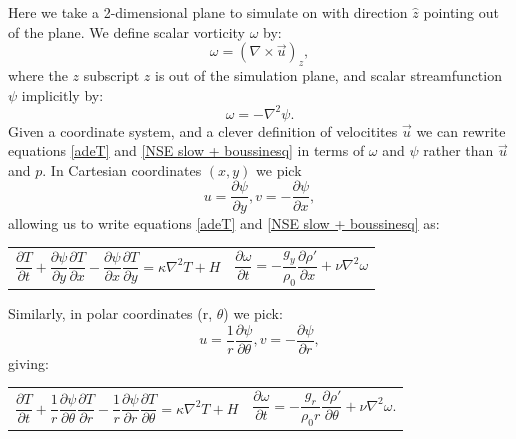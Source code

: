\documentclass{article}
\begin{document}
Here we take a 2-dimensional plane to simulate on with direction $\hat{z}$ pointing out of the plane. We define scalar vorticity $\omega$ by:
\begin{equation}
	\omega = (\nabla \times \vec{u})_z,
	\label{omega}
\end{equation}
where the $z$ subscript $z$ is out of the simulation plane, and scalar streamfunction $\psi$ implicitly by:
\begin{equation}
	\omega = - \nabla^2 \psi.
	\label{psi}
\end{equation}
Given a coordinate system, and a clever definition of velocitites $\vec{u}$ we can rewrite equations \ref{adeT} and \ref{NSE slow + boussinesq} in terms of $\omega$ and $\psi$ rather than $\vec{u}$ and $p$. In Cartesian coordinates $(x,y)$ we pick 
\begin{equation}
	u = \frac{\partial \psi}{\partial y}, v = -\frac{\partial \psi}{\partial x},
	\label{cartesian velocities}
\end{equation}
allowing us to write equations \ref{adeT} and \ref{NSE slow + boussinesq} as:
\begin{tabularx}{\textwidth}{XX}
\begin{equation}
	\frac{\partial T}{\partial t} + \frac{\partial \psi}{\partial y} \frac{\partial T}{\partial x} - \frac{\partial \psi}{\partial x} \frac{\partial T}{\partial y} = \kappa \nabla^2 T + H
	\label{adeT sfvt cartesian}
\end{equation}
    &
\begin{equation}
	\frac{\partial \omega}{\partial t} = -\frac{g_y}{\rho_0} \frac{\partial \rho'}{\partial x} + \nu \nabla^2 \omega
	\label{NSE slow + boussinesq sfvt cartesian}
\end{equation}
\end{tabularx}\par
Similarly, in polar coordinates (r, $\theta$) we pick:
\begin{equation}
	u = \frac{1}{r} \frac{\partial \psi}{\partial \theta}, v = -\frac{\partial \psi}{\partial r},
	\label{polar velocities}
\end{equation}
giving:
\begin{tabularx}{\textwidth}{XX}
\begin{equation}
	\frac{\partial T}{\partial t} + \frac{1}{r} \frac{\partial \psi}{\partial \theta} \frac{\partial T}{\partial r} - \frac{1}{r} \frac{\partial \psi}{\partial r} \frac{\partial T}{\partial \theta} = \kappa \nabla^2 T + H
	\label{adeT sfvt polar}
\end{equation}
    &
\begin{equation}
	\frac{\partial \omega}{\partial t} = - \frac{g_r}{\rho_0 r} \frac{\partial \rho'}{\partial \theta} +\nu \nabla^2 \omega.
	\label{NSE slow + boussinesq sfvt polar}
\end{equation}
\end{tabularx}\par
\end{document}
